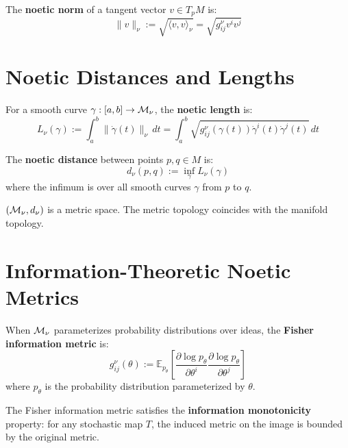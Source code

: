 \begin{definition}
\label{def:noetic-norm}
The \textbf{noetic norm} of a tangent vector $v \in T_pM$ is:
\[
    \|v\|_\nu := \sqrt{\langle v, v \rangle_\nu} = \sqrt{g^\nu_{ij} v^i v^j}
\]
\end{definition}

\section{Noetic Distances and Lengths}

\begin{definition}
\label{def:curve-length}
For a smooth curve $\gamma : [a, b] \to \mathcal{M}_\nu$, the \textbf{noetic length} is:
\[
    L_\nu(\gamma) := \int_a^b \|\dot{\gamma}(t)\|_\nu \, dt
    = \int_a^b \sqrt{g^\nu_{ij}(\gamma(t)) \dot{\gamma}^i(t) \dot{\gamma}^j(t)} \, dt
\]
\end{definition}

\begin{definition}
\label{def:noetic-distance}
The \textbf{noetic distance} between points $p, q \in M$ is:
\[
    d_\nu(p, q) := \inf_{\gamma} L_\nu(\gamma)
\]
where the infimum is over all smooth curves $\gamma$ from $p$ to $q$.
\end{definition}

\begin{theorem}
\label{thm:noetic-metric-space}
$(\mathcal{M}_\nu, d_\nu)$ is a metric space. The metric topology coincides
with the manifold topology.
\end{theorem}

\section{Information-Theoretic Noetic Metrics}

\begin{definition}
\label{def:fisher-metric}
When $\mathcal{M}_\nu$ parameterizes probability distributions over ideas,
the \textbf{Fisher information metric} is:
\[
    g^\nu_{ij}(\theta) := \mathbb{E}_{p_\theta}\left[
    \frac{\partial \log p_\theta}{\partial \theta^i}
    \frac{\partial \log p_\theta}{\partial \theta^j}
    \right]
\]
where $p_\theta$ is the probability distribution parameterized by $\theta$.
\end{definition}

\begin{proposition}
\label{prop:info-monotonicity}
The Fisher information metric satisfies the \textbf{information monotonicity}
property: for any stochastic map $T$, the induced metric on the image is
bounded by the original metric.
\end{proposition}

